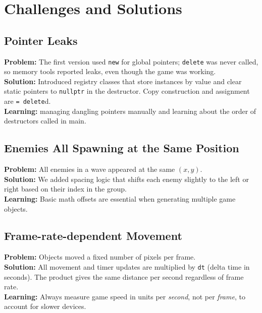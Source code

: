 \documentclass[11pt]{article}
\begin{document}
\clearpage
\section{Challenges and Solutions}

\subsection{Pointer Leaks}
\textbf{Problem:} The first version used \texttt{new} for global pointers;
\texttt{delete} was never called, so memory tools reported leaks, even though the game was working.\\[4pt]
\textbf{Solution:} Introduced registry classes that store instances by
value and clear static pointers to \texttt{nullptr} in the destructor. Copy
construction and assignment are \texttt{= delete}d.\\[4pt]
\textbf{Learning:} managing dangling pointers manually and learning about the order of destructors called in main.

\subsection{Enemies All Spawning at the Same Position}
\textbf{Problem:} All enemies in a wave appeared at the same $(x, y)$.\\[4pt]
\textbf{Solution:} We added spacing logic that shifts each enemy slightly to the left or right based on their index in the group.\\[4pt]
\textbf{Learning:} Basic math offsets are essential when generating multiple game objects.

\subsection{Frame-rate-dependent Movement}
\textbf{Problem:} Objects moved a fixed number of pixels per frame.\\[4pt]
\textbf{Solution:} All movement and timer updates are multiplied by \texttt{dt}
(delta time in seconds). The product gives the same distance per second
regardless of frame rate.\\[4pt]
\textbf{Learning:} Always measure game speed in units per \emph{second}, not
per \emph{frame}, to account for slower devices.

\clearpage
\end{document}

